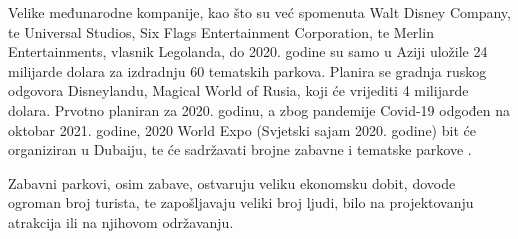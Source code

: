 Velike međunarodne kompanije, kao što su već spomenuta Walt Disney Company, te Universal Studios, Six Flags Entertainment Corporation, te Merlin Entertainments, vlasnik Legolanda, do 2020. godine su samo u Aziji uložile 24 milijarde dolara za izdradnju 60 tematskih parkova. Planira se gradnja ruskog odgovora Disneylandu, Magical World of Rusia, koji će vrijediti 4 milijarde dolara. Prvotno planiran za 2020. godinu, a zbog pandemije Covid-19 odgođen na oktobar 2021. godine, 2020 World Expo (Svjetski sajam 2020. godine) bit će organiziran u Dubaiju, te će sadržavati brojne zabavne i tematske parkove \cite{900years}. 

Zabavni parkovi, osim zabave, ostvaruju veliku ekonomsku dobit, dovode ogroman broj turista, te zapošljavaju veliki broj ljudi, bilo na projektovanju atrakcija ili na njihovom održavanju.

